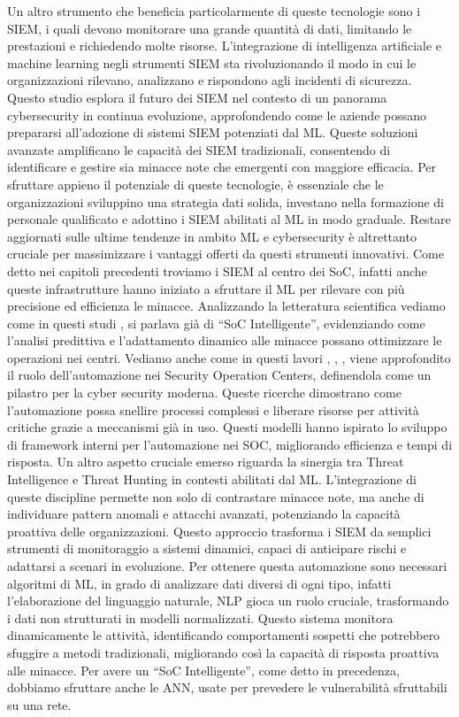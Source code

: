         Un altro strumento che beneficia particolarmente di queste tecnologie sono i SIEM, i quali devono monitorare una grande quantità di dati, limitando le prestazioni e richiedendo molte risorse. L'integrazione di intelligenza artificiale e machine learning negli strumenti SIEM sta rivoluzionando il modo in cui le organizzazioni rilevano, analizzano e rispondono agli incidenti di sicurezza. Questo studio \cite{ml_in_siem} esplora il futuro dei SIEM nel contesto di un panorama cybersecurity in continua evoluzione, approfondendo come le aziende possano prepararsi all'adozione di sistemi SIEM potenziati dal ML. Queste soluzioni avanzate amplificano le capacità dei SIEM tradizionali, consentendo di identificare e gestire sia minacce note che emergenti con maggiore efficacia. Per sfruttare appieno il potenziale di queste tecnologie, è essenziale che le organizzazioni sviluppino una strategia dati solida, investano nella formazione di personale qualificato e adottino i SIEM abilitati al ML in modo graduale. Restare aggiornati sulle ultime tendenze in ambito ML e cybersecurity è altrettanto cruciale per massimizzare i vantaggi offerti da questi strumenti innovativi. Come detto nei capitoli precedenti troviamo i SIEM al centro dei SoC, infatti anche queste infrastrutture hanno iniziato a sfruttare il ML per rilevare con più precisione ed efficienza le minacce. Analizzando la letteratura scientifica vediamo come in questi studi \cite{visualization_cyber_incident_paper}, \cite{improving_soc} si parlava già di “SoC Intelligente”, evidenziando come l'analisi predittiva e l'adattamento dinamico alle minacce possano ottimizzare le operazioni nei centri.
        Vediamo anche come in questi lavori \cite{modern_soc}, \cite{aut_in_soc}, \cite{MITRE_and_ml}, viene approfondito il ruolo dell'automazione nei Security Operation Centers, definendola come un pilastro per la cyber security moderna. Queste ricerche dimostrano come l'automazione possa snellire processi complessi e liberare risorse per attività critiche grazie a meccanismi già in uso. Questi modelli hanno ispirato lo sviluppo di framework interni per l'automazione nei SOC, migliorando efficienza e tempi di risposta.
        Un altro aspetto cruciale emerso riguarda la sinergia tra Threat Intelligence e Threat Hunting in contesti abilitati dal ML. L'integrazione di queste discipline permette non solo di contrastare minacce note, ma anche di individuare pattern anomali e attacchi avanzati, potenziando la capacità proattiva delle organizzazioni. Questo approccio trasforma i SIEM da semplici strumenti di monitoraggio a sistemi dinamici, capaci di anticipare rischi e adattarsi a scenari in evoluzione. Per ottenere questa automazione sono necessari algoritmi di ML, in grado di analizzare dati diversi di ogni tipo, infatti  l'elaborazione del linguaggio naturale, NLP gioca un ruolo cruciale, trasformando i dati non strutturati in modelli normalizzati. Questo sistema monitora dinamicamente le attività, identificando comportamenti sospetti che potrebbero sfuggire a metodi tradizionali, migliorando così la capacità di risposta proattiva alle minacce. Per avere un “SoC Intelligente”, come detto in precedenza, dobbiamo sfruttare anche le ANN,  usate per prevedere le vulnerabilità sfruttabili su una rete.
